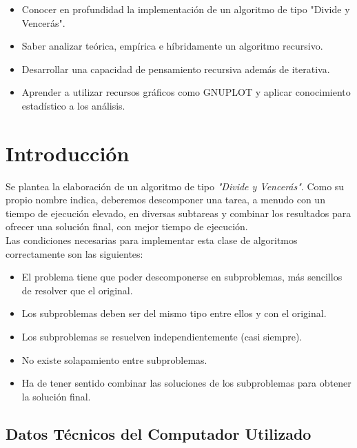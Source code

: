 \documentclass[a4paper,12pt,twoside]{article} %
\begin{document}
	\begin{itemize}
		\item Conocer en profundidad la implementación de un algoritmo de tipo "Divide y Vencerás".
		\item Saber analizar teórica, empírica e híbridamente un algoritmo recursivo.
		\item Desarrollar una capacidad de pensamiento recursiva además de iterativa.
		\item Aprender a utilizar recursos gráficos como GNUPLOT y aplicar conocimiento estadístico a los análisis.
	\end{itemize}
\newpage


\section{Introducción}

Se plantea la elaboración de un algoritmo de tipo \textit{"Divide y Vencerás"}. Como su propio nombre indica, deberemos descomponer una tarea, a menudo con un tiempo de ejecución elevado, en diversas subtareas y combinar los resultados para ofrecer una solución final, con mejor tiempo de ejecución.\\

Las condiciones necesarias para implementar esta clase de algoritmos correctamente son las siguientes:

\begin{itemize}

	\item El problema tiene que poder descomponerse en subproblemas, más sencillos de resolver que el original.
	\item Los subproblemas deben ser del mismo tipo entre ellos y con el original.
	\item Los subproblemas se resuelven independientemente (casi siempre).
	\item No existe solapamiento entre subproblemas.
	\item Ha de tener sentido combinar las soluciones de los subproblemas para obtener la solución final.

\end{itemize}


\subsection{Datos Técnicos del Computador Utilizado}
\end{document}
